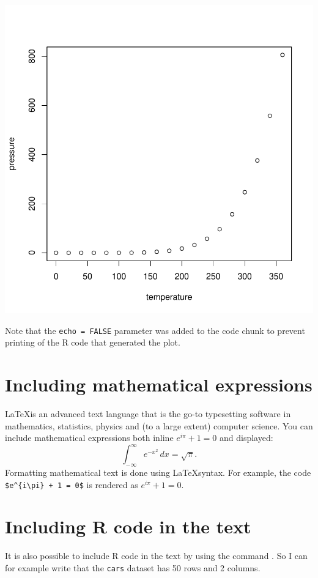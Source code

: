\documentclass{article}
\begin{document}
\includegraphics{sample-RSweave-file-pressure}

Note that the \texttt{echo = FALSE} parameter was added to the code chunk to prevent printing of the R code that generated the plot.

\section*{Including mathematical expressions}

\LaTeX is an advanced text language that is the go-to typesetting software in mathematics, statistics, physics and (to a large extent) computer science.
You can include mathematical expressions both inline $e^{i\pi} + 1 = 0$ and displayed:
\[
\int_{-\infty}^\infty e^{-x^2} \, dx = \sqrt{\pi}.
\]
Formatting mathematical text is done using \LaTeX syntax. 
For example, the code \verb|$e^{i\pi} + 1 = 0$| is rendered as $e^{i\pi} + 1 = 0$.

\section*{Including R code in the text}

It is also possible to include R code in the text by using the command \verb||. So I can for example write that the \texttt{cars} dataset has 50 rows and 2 columns. 
\end{document}
